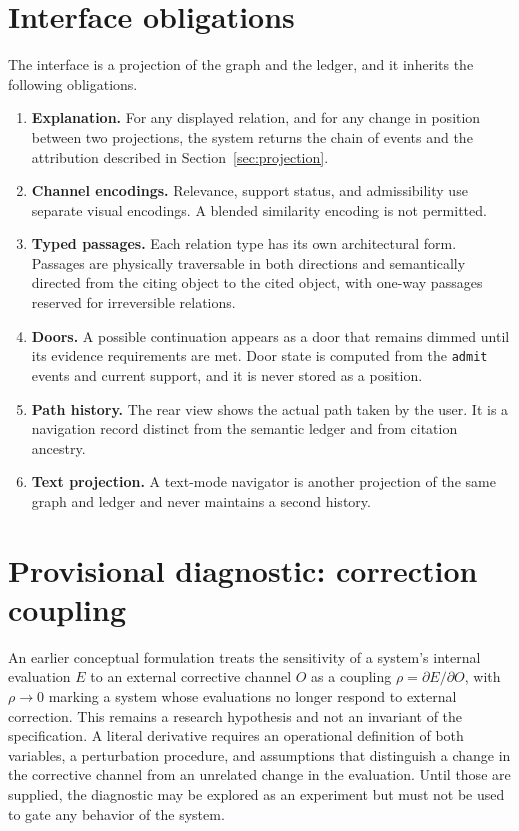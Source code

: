 \documentclass[11pt]{article}
\theoremstyle{definition}
\newcommand{\ev}[1]{\texttt{#1}}
\begin{document}
\section{Interface obligations}

The interface is a projection of the graph and the ledger, and it inherits the following obligations.

\begin{enumerate}[leftmargin=1.5em]
\item \textbf{Explanation.} For any displayed relation, and for any change in position between two projections, the system returns the chain of events and the attribution described in Section~\ref{sec:projection}.
\item \textbf{Channel encodings.} Relevance, support status, and admissibility use separate visual encodings. A blended similarity encoding is not permitted.
\item \textbf{Typed passages.} Each relation type has its own architectural form. Passages are physically traversable in both directions and semantically directed from the citing object to the cited object, with one-way passages reserved for irreversible relations.
\item \textbf{Doors.} A possible continuation appears as a door that remains dimmed until its evidence requirements are met. Door state is computed from the \ev{admit} events and current support, and it is never stored as a position.
\item \textbf{Path history.} The rear view shows the actual path taken by the user. It is a navigation record distinct from the semantic ledger and from citation ancestry.
\item \textbf{Text projection.} A text-mode navigator is another projection of the same graph and ledger and never maintains a second history.
\end{enumerate}

\section{Provisional diagnostic: correction coupling}

An earlier conceptual formulation treats the sensitivity of a system's internal evaluation $E$ to an external corrective channel $O$ as a coupling $\rho = \partial E / \partial O$, with $\rho \to 0$ marking a system whose evaluations no longer respond to external correction. This remains a research hypothesis and not an invariant of the specification. A literal derivative requires an operational definition of both variables, a perturbation procedure, and assumptions that distinguish a change in the corrective channel from an unrelated change in the evaluation. Until those are supplied, the diagnostic may be explored as an experiment but must not be used to gate any behavior of the system.
\end{document}
